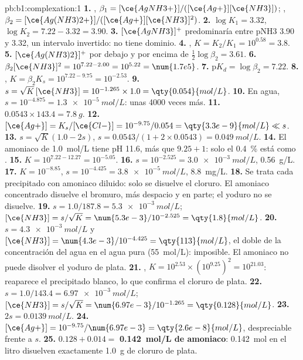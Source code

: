 \begin{solution}{pb:b1:complexation:1}
\textbf{1.} , $\beta_1 = [\ce{AgNH3+}]/([\ce{Ag+}][\ce{NH3}])$;
, $\beta_2 = [\ce{Ag(NH3)2+}]/([\ce{Ag+}][\ce{NH3}]^2)$.
\textbf{2.} $\log K_1 = 3.32$, $\log K_2 = 7.22 - 3.32 = 3.90$.
\textbf{3.} $[\ce{AgNH3}]^{+}$ predominaría entre pNH3 3.90 y 3.32, un
intervalo invertido: no tiene dominio.
\textbf{4.} , $K = K_2/K_1 = 10^{0.58} =
3.8$.
\textbf{5.} $[\ce{Ag(NH3)2}]^{+}$ por debajo y  por encima de
$\frac12\log\beta_2 = 3.61$.
\textbf{6.} $\beta_2[\ce{NH3}]^2 = 10^{7.22 - 2.00} = 10^{5.22} = \num{1.7e5}$.
\textbf{7.} $\mathrm{p}K_d = \log\beta_2 = 7.22$.
\textbf{8.} , $K = \beta_2K_s =
10^{7.22 - 9.75} = 10^{-2.53}$.
\textbf{9.} $s = \sqrt{K}\,[\ce{NH3}] = 10^{-1.265} \times 1.0 =
\qty{0.054}{mol/L}$.
\textbf{10.} En agua, $s = 10^{-4.875} = \qty{1.3e-5}{mol/L}$: unas 4000
veces más.
\textbf{11.} $0.0543 \times 143.4 = \qty{7.8}{g}$.
\textbf{12.} $[\ce{Ag+}] = K_s/[\ce{Cl-}] = 10^{-9.75}/0.054 =
\qty{3.3e-9}{mol/L} \ll s$.
\textbf{13.} $s = \sqrt{K}(1.0 - 2s)$, $s = 0.0543/(1 + 2 \times 0.0543) =
\qty{0.049}{mol/L}$.
\textbf{14.} El amoniaco de \qty{1.0}{mol/L} tiene pH 11.6, más que
$9.25 + 1$: solo el \qty{0.4}{\percent} está como .
\textbf{15.} $K = 10^{7.22 - 12.27} = 10^{-5.05}$.
\textbf{16.} $s = 10^{-2.525} = \qty{3.0e-3}{mol/L}$, \qty{0.56}{g/L}.
\textbf{17.} $K = 10^{-8.85}$, $s = 10^{-4.425} = \qty{3.8e-5}{mol/L}$,
\qty{8.8}{mg/L}.
\textbf{18.} Se trata cada precipitado con amoniaco diluido: solo se
disuelve el cloruro. El amoniaco concentrado disuelve el bromuro, más
despacio y en parte; el yoduro no se disuelve.
\textbf{19.} $s = 1.0/187.8 = \qty{5.3e-3}{mol/L}$; $[\ce{NH3}] = s/\sqrt{K}
= \num{5.3e-3}/10^{-2.525} = \qty{1.8}{mol/L}$.
\textbf{20.} $s = \qty{4.3e-3}{mol/L}$ y $[\ce{NH3}] = \num{4.3e-3}/10^{-4.425}
= \qty{113}{mol/L}$, el doble de la concentración del agua en el agua pura
(\qty{55}{mol/L}): imposible. El amoniaco no puede disolver el yoduro de
plata.
\textbf{21.} ,
$K = 10^{2.53} \times (10^{9.25})^2 = 10^{21.03}$: reaparece el
precipitado blanco, lo que confirma el cloruro de plata.
\textbf{22.} $s = 1.0/143.4 = \qty{6.97e-3}{mol/L}$; $[\ce{NH3}] =
s/\sqrt{K} = \num{6.97e-3}/10^{-1.265} = \qty{0.128}{mol/L}$.
\textbf{23.} $2s = \qty{0.0139}{mol/L}$.
\textbf{24.} $[\ce{Ag+}] = 10^{-9.75}/\num{6.97e-3} = \qty{2.6e-8}{mol/L}$,
despreciable frente a $s$.
\textbf{25.} $0.128 + 0.014 = $ \textbf{\qty{0.142}{mol/L} de amoniaco}:
\qty{0.142}{mol} en el litro disuelven exactamente \qty{1.0}{g} de
cloruro de plata.
\end{solution}
